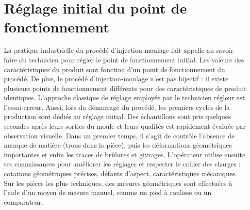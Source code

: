 \section{Réglage initial du point de fonctionnement}
La pratique industrielle du procédé d'injection-moulage fait appelle au savoir-faire du technicien pour régler le point de fonctionnement initial.
Les valeurs des caractéristiques du produit sont fonction d'un point de fonctionnement du procédé.
De plus, le procédé d'injection-moulage n'est pas bijectif : il existe plusieurs points de fonctionnement différents pour des caractéristiques de produit identiques.
L’approche classique de réglage employée par le technicien régleur est l’essai-erreur.
Aussi, lors du démarrage du procédé, les premiers cycles de la production sont dédiés au réglage initial.
Des échantillons sont pris quelques secondes après leurs sorties du moule et leurs qualités est rapidement évaluée par observation visuelle.
Dans un premier temps, il s'agit de contrôle l'absence de manque de matière (trous dans la pièce), puis les déformations géométriques importantes et enfin les traces de brûlures et givrages.
L’opérateur utilise ensuite ses connaissances pour améliorer les réglages et respecter le cahier des charges : cotations géométriques précises, défauts d'aspect, caractéristiques mécaniques.
Sur les pièces les plus techniques, des mesures géométriques sont effectuées à l'aide d'un moyen de mesure manuel, comme un pied à coulisse ou un comparateur.

